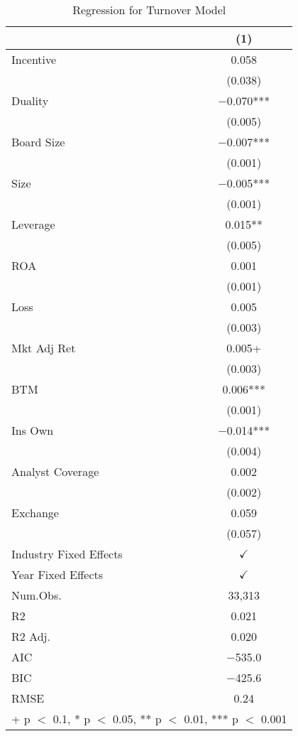 \documentclass[12pt,english]{article}
\begin{document}
\begin{table}[ht]
\caption{Regression for Turnover Model}
\label{tab:turnover}
\centering
\begin{tabular}[t]{lc}
\toprule
  & (1)\\
\midrule
Incentive & \num{0.058}\\
 & (\num{0.038})\\
Duality & \num{-0.070}***\\
 & \vphantom{1} (\num{0.005})\\
Board Size & \num{-0.007}***\\
 & \vphantom{3} (\num{0.001})\\
Size & \num{-0.005}***\\
 & \vphantom{2} (\num{0.001})\\
Leverage & \num{0.015}**\\
 & (\num{0.005})\\
ROA & \num{0.001}\\
 & \vphantom{1} (\num{0.001})\\
Loss & \num{0.005}\\
 & \vphantom{1} (\num{0.003})\\
Mkt Adj Ret & \num{0.005}+\\
 & (\num{0.003})\\
BTM & \num{0.006}***\\
 & (\num{0.001})\\
Ins Own & \num{-0.014}***\\
 & (\num{0.004})\\
Analyst Coverage & \num{0.002}\\
 & (\num{0.002})\\
Exchange & \num{0.059}\\
 & (\num{0.057})\\
Industry Fixed Effects  & $\checkmark$\\
Year Fixed Effects      & $\checkmark$\\
\midrule
Num.Obs. & 33,313\\
R2 & \num{0.021}\\
R2 Adj. & \num{0.020}\\
AIC & \num{-535.0}\\
BIC & \num{-425.6}\\
RMSE & \num{0.24}\\
\bottomrule
\multicolumn{2}{l}{\rule{0pt}{1em}+ p $<$ 0.1, * p $<$ 0.05, ** p $<$ 0.01, *** p $<$ 0.001}\\
\end{tabular}
\end{table}
\end{document}
